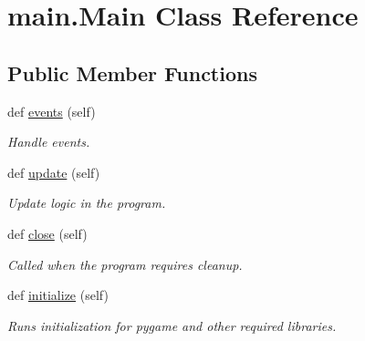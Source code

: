 \hypertarget{classmain_1_1_main}{}\section{main.\+Main Class Reference}
\label{classmain_1_1_main}
\subsection*{Public Member Functions}
\begin{DoxyCompactItemize}
\item 
\mbox{\label{classmain_1_1_main_a48f9a2afbf7910730831e11e4bdb14f6}} 
def \mbox{\hyperlink{classmain_1_1_main_a48f9a2afbf7910730831e11e4bdb14f6}{events}} (self)
\begin{DoxyCompactList}\small\item\em Handle events. \end{DoxyCompactList}\item 
def \mbox{\hyperlink{classmain_1_1_main_a545b7274163905d774eb82734ed41a81}{update}} (self)
\begin{DoxyCompactList}\small\item\em Update logic in the program. \end{DoxyCompactList}\item 
\mbox{\label{classmain_1_1_main_ac4b0b1b614b16626a34ab818dd009c73}} 
def \mbox{\hyperlink{classmain_1_1_main_ac4b0b1b614b16626a34ab818dd009c73}{close}} (self)
\begin{DoxyCompactList}\small\item\em Called when the program requires cleanup. \end{DoxyCompactList}\item 
\mbox{\label{classmain_1_1_main_a3785299457549ed530603ff6db7465b3}} 
def \mbox{\hyperlink{classmain_1_1_main_a3785299457549ed530603ff6db7465b3}{initialize}} (self)
\begin{DoxyCompactList}\small\item\em Runs initialization for pygame and other required libraries. \end{DoxyCompactList}\end{DoxyCompactItemize}
